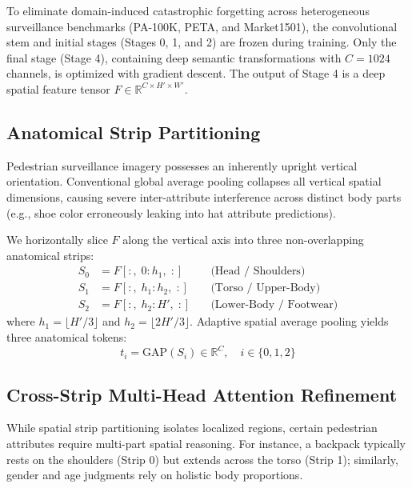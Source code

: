 To eliminate domain-induced catastrophic forgetting across heterogeneous surveillance benchmarks (PA-100K, PETA, and Market1501), the convolutional stem and initial stages (Stages 0, 1, and 2) are frozen during training. Only the final stage (Stage 4), containing deep semantic transformations with $C=1024$ channels, is optimized with gradient descent. The output of Stage 4 is a deep spatial feature tensor $F \in \mathbb{R}^{C \times H' \times W'}$.

\subsection{Anatomical Strip Partitioning}
Pedestrian surveillance imagery possesses an inherently upright vertical orientation. Conventional global average pooling collapses all vertical spatial dimensions, causing severe inter-attribute interference across distinct body parts (e.g., shoe color erroneously leaking into hat attribute predictions).

We horizontally slice $F$ along the vertical axis into three non-overlapping anatomical strips:
\begin{align}
    S_0 &= F\left[:, \; 0 : h_1, \; :\right] \quad &\text{(Head / Shoulders)} \\
    S_1 &= F\left[:, \; h_1 : h_2, \; :\right] \quad &\text{(Torso / Upper-Body)} \\
    S_2 &= F\left[:, \; h_2 : H', \; :\right] \quad &\text{(Lower-Body / Footwear)}
\end{align}
where $h_1 = \lfloor H'/3 \rfloor$ and $h_2 = \lfloor 2H'/3 \rfloor$. Adaptive spatial average pooling yields three anatomical tokens:
\begin{equation}
    t_i = \mathrm{GAP}(S_i) \in \mathbb{R}^C, \quad i \in \{0, 1, 2\}
\end{equation}

\subsection{Cross-Strip Multi-Head Attention Refinement}
While spatial strip partitioning isolates localized regions, certain pedestrian attributes require multi-part spatial reasoning. For instance, a backpack typically rests on the shoulders (Strip 0) but extends across the torso (Strip 1); similarly, gender and age judgments rely on holistic body proportions.

